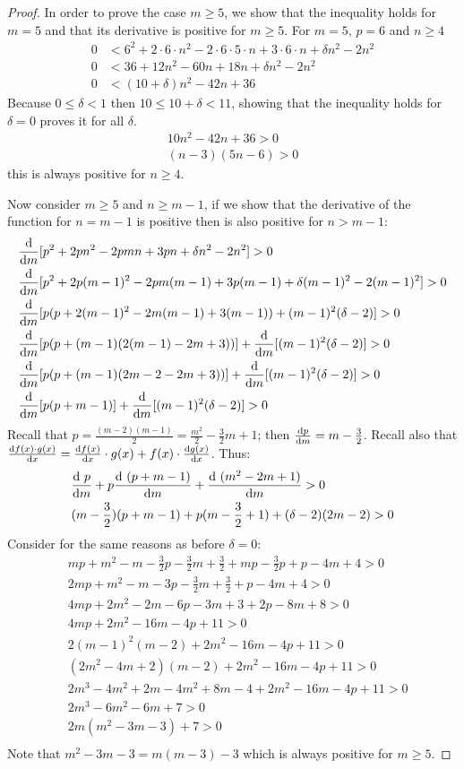 \documentclass[version=3.21, pagesize, twoside=off, bibliography=totoc, DIV=calc, fontsize=12pt, a4paper]{scrartcl}
\begin{document}
\begin{proof}
	In order to prove the case $m\geq5$, we show that the inequality holds for $m=5$ and that its derivative is positive for $m\geq5$.
	For $m=5$, $p=6$ and $n\geq4$
	\begin{align}
		0&< 6^2+2 \cdot 6 \cdot n^2-2 \cdot 6 \cdot 5 \cdot n+3 \cdot 6 \cdot n+\delta n^2-2 n^2\\
		0&< 36+12 n^2-60 n+18n+ \delta n^2-2 n^2 \\
		0&<(10+\delta)n^2-42n+36
	\end{align}
	Because $0 \leq \delta < 1$ then $10 \leq 10+\delta < 11$, showing that the inequality holds for $\delta=0$ proves it for all $\delta$.
	\begin{align}
		10n^2-42n+36>0 \\
		(n - 3) (5n - 6)>0
	\end{align}
	this is always positive for $n\geq4$.
	
	Now consider $m\geq5$ and $n\geq m-1$, if we show that the derivative of the function for $n=m-1$ is positive then is also positive for $n>m-1$: 
	\begin{align}
		&\dv{m}[p^2+2p n^2-2p m n+3p n+\delta n^2-2 n^2]>0 \\
		&\dv{m}[p^2+2p (m-1)^2-2p m (m-1)+3p (m-1)+\delta (m-1)^2-2 (m-1)^2]>0 \\
		&\dv{m}[p (p+2(m-1)^2-2m(m-1)+3(m-1))+(m-1)^2(\delta-2)]>0\\
		&\dv{m}[p (p+(m-1)(2(m-1)-2m+3))]+\dv{m}[(m-1)^2(\delta-2)]>0\\
		&\dv{m}[p (p+(m-1)(2m-2-2m+3))]+\dv{m}[(m-1)^2(\delta-2)]>0\\
		&\dv{m}[p (p+m-1)]+\dv{m}[(m-1)^2(\delta-2)]>0\\
	\end{align}
	Recall that $p=\frac{(m-2)(m-1)}{2}=\frac{m^2}{2}-\frac{3}{2}m+1$; then $\dv{p}{m}=m-\frac{3}{2}$. 
	Recall also that $\dv{f(x)\cdot g(x)}{x}=\dv{f(x)}{x}\cdot g(x) + f(x) \cdot \dv{g(x)}{x}$. Thus:
	\begin{align}
		&\dv{\ p}{m}(p+m-1)+p\dv{\ (p+m-1)}{m} +\dv{\ (m^2-2m+1)}{m}(\delta-2)>0\\
		&(m-\frac{3}{2})(p+m-1)+p(m-\frac{3}{2}+1)+(\delta-2)(2m-2)>0\\
	\end{align}
	Consider for the same reasons as before $\delta=0$:
	\begin{align}
		&mp+m^2-m-\frac{3}{2}p-\frac{3}{2}m+\frac{3}{2}+mp-\frac{3}{2}p+p-4m+4>0 \\
		&2mp+m^2-m-3p-\frac{3}{2}m+\frac{3}{2}+p-4m+4>0 \\
		&4mp+2m^2-2m-6p-3m+3+2p-8m+8>0 \\
		&4mp+2m^2-16m-4p+11>0 \\
		&2(m-1)^2(m-2)+2m^2-16m-4p+11>0\\
		&(2m^2-4m+2)(m-2)+2m^2-16m-4p+11>0\\
		&2m^3-4m^2+2m-4m^2+8m-4+2m^2-16m-4p+11>0\\
		&2m^3-6m^2-6m+7>0\\
		&2m(m^2-3m-3)+7>0\\
	\end{align}
	Note that $m^2-3m-3=m(m-3)-3$ which is always positive for $m\geq 5$.
\end{proof}
\end{document}
